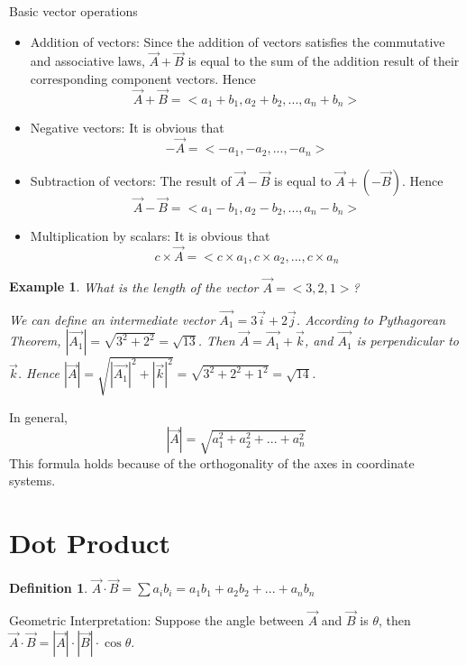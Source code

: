 \documentclass{article}
\newtheorem*{definition}{Definition}
\newtheorem{example}{Example}
\begin{document}
Basic vector operations
\begin{itemize}
	\item Addition of vectors: Since the addition of vectors satisfies the
	commutative and associative laws, $\vec{A} + \vec{B}$ is equal to the sum
	of the addition result of their corresponding component vectors. Hence
	\[ \vec{A} + \vec{B} = <a_{1} + b_{1}, a_{2} + b_{2}, ..., a_{n} + b_{n}> \]
	
	\item Negative vectors: It is obvious that
	\[ -\vec{A} = <-a_{1}, -a_{2}, ..., -a_{n}> \]
	
	\item Subtraction of vectors: The result of $\vec{A} - \vec{B}$ is equal to
	$\vec{A} + (-\vec{B})$. Hence
	\[ \vec{A} - \vec{B} = <a_{1} - b_{1}, a_{2} - b_{2}, ..., a_{n} - b_{n}> \]
	
	\item Multiplication by scalars: It is obvious that
	\[ c \times \vec{A} = <c \times a_{1}, c \times a_{2}, ..., c \times a_{n} \]
\end{itemize}

\begin{example}
What is the length of the vector $\vec{A} = <3, 2, 1>$?

We can define an intermediate vector $\vec{A_{1}} = 3\vec{i} + 2\vec{j}$.
According to Pythagorean Theorem, $|\vec{A_{1}}| = \sqrt{3^2 + 2^2} = \sqrt{13}$.
Then $\vec{A} = \vec{A_{1}} + \vec{k}$, and $\vec{A_{1}}$ is perpendicular to
$\vec{k}$. Hence $|\vec{A}| = \sqrt{|\vec{A_{1}}|^2 + |\vec{k}|^2} =
\sqrt{3^2 + 2^2 + 1^2} = \sqrt{14}$.
\end{example}

In general,
\[ |\vec{A}| = \sqrt{a_{1}^{2} + a_{2}^{2} + ... + a_{n}^{2}} \]
This formula holds because of the orthogonality of the axes in coordinate
systems.

\section{Dot Product}

\begin{definition}
$\vec{A} \cdot \vec{B} = \sum a_{i}b_{i} = a_{1}b_{1} + a_{2}b_{2} + ... + a_{n}b_{n}$
\end{definition}

Geometric Interpretation: Suppose the angle between $\vec{A}$ and $\vec{B}$ is
$\theta$, then $\vec{A} \cdot \vec{B} = |\vec{A}| \cdot |\vec{B}| \cdot \cos\theta$.
\end{document}
